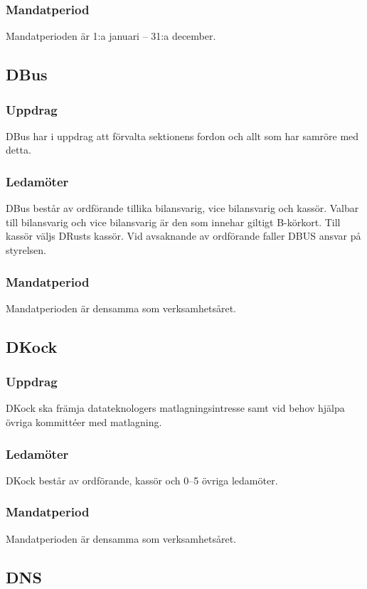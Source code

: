 \subsubsection{Mandatperiod}
Mandatperioden är 1:a januari – 31:a december.

\subsection{DBus}
\subsubsection{Uppdrag}
DBus har i uppdrag att förvalta sektionens fordon och allt som har samröre med detta.
\subsubsection{Ledamöter}
DBus består av ordförande tillika bilansvarig, vice bilansvarig och kassör. Valbar till bilansvarig och vice bilansvarig är den som innehar giltigt B-körkort. Till kassör väljs DRusts kassör. Vid avsaknande av ordförande faller DBUS ansvar på styrelsen.
\subsubsection{Mandatperiod}
Mandatperioden är densamma som verksamhetsåret.

\subsection{DKock}
\subsubsection{Uppdrag}
DKock ska främja datateknologers matlagningsintresse samt vid behov hjälpa övriga kommittéer med matlagning.
\subsubsection{Ledamöter}
DKock består av ordförande, kassör och 0--5 övriga ledamöter.
\subsubsection{Mandatperiod}
Mandatperioden är densamma som verksamhetsåret.

\subsection{DNS}
